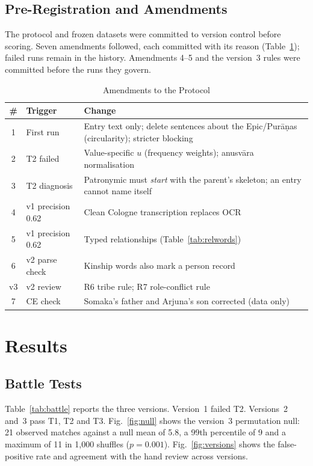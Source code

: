 \documentclass[journal]{IEEEtran}
\begin{document}
\subsection{Pre-Registration and Amendments}
The protocol and frozen datasets were committed to version control before scoring. Seven amendments followed, each
committed with its reason (Table~\ref{tab:amend}); failed runs remain in the history. Amendments 4--5 and the version~3
rules were committed before the runs they govern.

\begin{table}[!t]
\caption{Amendments to the Protocol}
\label{tab:amend}
\centering\footnotesize
\begin{tabularx}{\columnwidth}{@{}clX@{}}
\toprule
\# & Trigger & Change \\
\midrule
1 & First run & Entry text only; delete sentences about the Epic/Purāṇas (circularity); stricter blocking \\
2 & T2 failed & Value-specific $u$ (frequency weights); anusvāra normalisation \\
3 & T2 diagnosis & Patronymic must \emph{start} with the parent's skeleton; an entry cannot name itself \\
4 & v1 precision 0.62 & Clean Cologne transcription replaces OCR \\
5 & v1 precision 0.62 & Typed relationships (Table~\ref{tab:relwords}) \\
6 & v2 parse check & Kinship words also mark a person record \\
v3 & v2 review & R6 tribe rule; R7 role-conflict rule \\
7 & CE check & Somaka's father and Arjuna's son corrected (data only) \\
\bottomrule
\end{tabularx}
\end{table}

\section{Results}

\subsection{Battle Tests}
Table~\ref{tab:battle} reports the three versions. Version~1 failed T2. Versions~2 and~3 pass T1, T2 and T3.
Fig.~\ref{fig:null} shows the version~3 permutation null: 21 observed matches against a null mean of 5.8, a 99th
percentile of 9 and a maximum of 11 in 1,000 shuffles ($p=0.001$). Fig.~\ref{fig:versions} shows the false-positive
rate and agreement with the hand review across versions.
\end{document}
